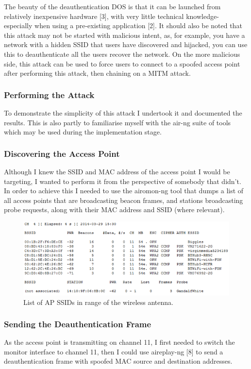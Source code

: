 The beauty of the deauthentication DOS is that it can be launched from relatively inexpensive hardware [3], with very little technical knowledge- especially when using a pre-existing application [2]. It should also be noted that this attack may not be started with malicious intent, as, for example, you have a network with a hidden SSID that users have discovered and hijacked, you can use this to deauthenticate all the users recover the network. On the more malicious side, this attack can be used to force users to connect to a spoofed access point after performing this attack, then chaining on a MITM attack.

\subsubsection*{Performing the Attack}
To demonstrate the simplicity of this attack I undertook it and documented the results. This is also partly to familiarise myself with the air-ng suite of tools which may be used during the implementation stage. 

\subsubsection*{Discovering the Access Point}
Although I knew the SSID and MAC address of the access point I would be targeting, I wanted to perform it from the perspective of somebody that didn’t. In order to achieve this I needed to use the airomon-ng tool that dumps a list of all access points that are broadcasting beacon frames, and stations broadcasting probe requests, along with their MAC address and SSID (where relevant).

\begin{figure}[h!]
\includegraphics[width=\linewidth]{research/attackvectors/figures/ddos-1.png}
\caption{List of AP SSIDs in range of the wireless antenna.}
\end{figure}

\subsubsection*{Sending the Deauthentication Frame}
As the access point is transmitting on channel 11, I first needed to switch the monitor interface to channel 11, then I could use aireplay-ng [8] to send a deauthentication frame with spoofed MAC source and destination addresses.

